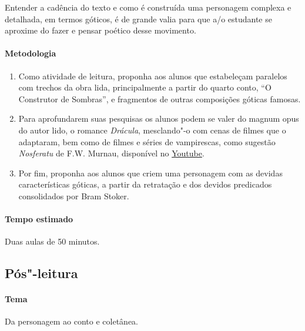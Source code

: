 \documentclass[12pt]{extarticle}
\begin{document}
Entender a cadência do texto e como é construída uma personagem complexa e detalhada, em 
termos góticos, é de grande valia para que a/o estudante se aproxime do fazer e pensar poético 
desse movimento. 

\paragraph{Metodologia}

\begin{enumerate}
\item
Como atividade de leitura, proponha aos alunos que estabeleçam paralelos com trechos da obra
lida, principalmente a partir do quarto conto, ``O Construtor de Sombras'', e fragmentos de outras 
composições góticas famosas. 

\item
Para aprofundarem suas pesquisas os alunos podem se valer do magnum opus do autor lido, o romance 
\emph{Drácula}, mesclando"-o com cenas de filmes que o adaptaram, bem como de filmes e séries de
vampirescas, como sugestão \emph{Nosferatu} de F.W. Murnau, disponível no \href{https://www.youtube.com/watch?v=FC6jFoYm3xs&ab_channel=TimelessClassicMovies}{Youtube}.


\item
Por fim, proponha aos alunos que criem uma personagem com as devidas características góticas, 
a partir da retratação e dos devidos predicados consolidados por Bram Stoker.
 
\end{enumerate}

\paragraph{Tempo estimado} Duas aulas de 50 minutos. 

\subsection{Pós"-leitura}


\paragraph{Tema} Da personagem ao conto e coletânea. 
\end{document}
